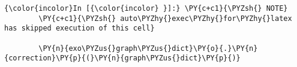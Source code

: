     \begin{Verbatim}[commandchars=\\\{\},frame=single,framerule=0.3mm,rulecolor=\color{cellframecolor}]
{\color{incolor}In [{\color{incolor} }]:} \PY{c+c1}{\PYZsh{} NOTE}
        \PY{c+c1}{\PYZsh{} auto\PYZhy{}exec\PYZhy{}for\PYZhy{}latex has skipped execution of this cell}
        
        \PY{n}{exo\PYZus{}graph\PYZus{}dict}\PY{o}{.}\PY{n}{correction}\PY{p}{(}\PY{n}{graph\PYZus{}dict}\PY{p}{)}
\end{Verbatim}



    
    
    
